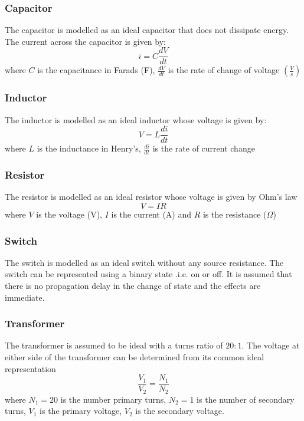 \subsubsection{Capacitor} The capacitor is modelled as an ideal capacitor that does not dissipate energy. The current across the capacitor is given by:
\begin{equation}
    i = C \frac{dV}{dt}
    \label{eq:ideal_capacitor}
\end{equation}
where $C$ is the capacitance in Farads (F), $\frac{dV}{dt}$ is the rate of change of voltage $\left(\frac{V}{s}\right)$

\subsubsection{Inductor} The inductor is modelled as an ideal inductor whose voltage is given by:
\begin{equation}
    V = L\frac{di}{dt}
\end{equation}
where $L$ is the inductance in Henry's, $\frac{di}{dt}$ is the rate of current change
\subsubsection{Resistor} The resistor is modelled as an ideal resistor whose voltage is given by Ohm's law
\begin{equation}
    V=IR
\end{equation}
where $V$ is the voltage (V), $I$ is the current (A) and $R$ is the resistance ($\Omega$)

\subsubsection{Switch} The switch is modelled as an ideal switch without any source resistance. The switch can be represented using a binary state .i.e. on or off. It is assumed that there is no propagation delay in the change of state and the effects are immediate. 

\subsubsection{Transformer} The transformer is assumed to be ideal with a turns ratio of $20:1$. The voltage at either side of the transformer can be determined from its common ideal representation
\begin{equation}
    \frac{V_1}{V_2} = \frac{N_1}{N_2}
\end{equation}
where $N_1=20$ is the number primary turns, $N_2=1$ is the number of secondary turns, $V_1$ is the primary voltage, $V_2$ is the secondary voltage.\\

